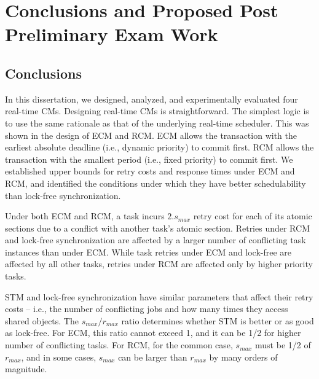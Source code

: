 \documentclass[12pt,english]{report}
\begin{document}
\thispagestyle{empty}



\pagestyle{myheadings}

\chapter{\label{conclusions} Conclusions and Proposed Post Preliminary Exam Work}

\section{Conclusions}

In this dissertation, we designed, analyzed, and experimentally evaluated four real-time CMs. Designing real-time CMs is straightforward. The simplest logic is to use the same rationale as that of the underlying real-time scheduler. This was shown in the design of ECM and RCM. ECM allows the transaction with the earliest absolute deadline (i.e., dynamic priority) to commit first. RCM allows the transaction with the smallest period (i.e., fixed priority) to commit first. We established upper bounds for retry costs and response times under ECM and RCM, and identified the conditions under which they have better schedulability than lock-free synchronization. 

Under both ECM and RCM, a task incurs $2.s_{max}$ retry cost for each of its atomic sections due to a conflict with another task's atomic section. Retries under RCM and lock-free synchronization are affected by a larger number of conflicting task instances than under ECM. While task retries under ECM and lock-free are affected by all other tasks, retries under RCM are affected only by higher priority tasks. 

STM and lock-free synchronization have similar parameters that affect their retry costs -- i.e., the number of conflicting jobs and how many times they access shared objects. The $s_{max}/r_{max}$ ratio determines whether STM is better or as good as lock-free. For ECM, this ratio cannot exceed 1, and it can be 1/2 for higher number of conflicting tasks. For RCM, for the common case, $s_{max}$ must be 1/2 of $r_{max}$, and in some cases, $s_{max}$ can be larger than $r_{max}$ by many orders of magnitude.
\end{document}
